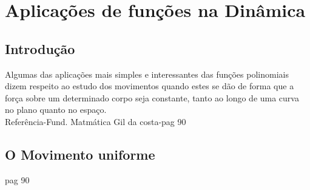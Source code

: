 \chapter{Aplicações de funções na Dinâmica}
\section{Introdução}
Algumas das aplicações mais simples e interessantes das funções polinomiais dizem respeito ao estudo dos movimentos quando estes se dão de forma que a força sobre um determinado corpo seja constante, tanto ao longo de uma curva no plano quanto no espaço.\\

Referência-Fund. Matmática Gil da costa-pag 90
\section{ O Movimento uniforme}
pag 90